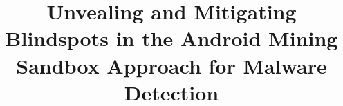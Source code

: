 \documentclass[10pt,conference]{IEEEtran}
\begin{document}
\title{Unvealing and Mitigating Blindspots in the Android Mining Sandbox Approach for Malware Detection}

\author{

  }

\maketitle



%
%




\balance 



\end{document}
